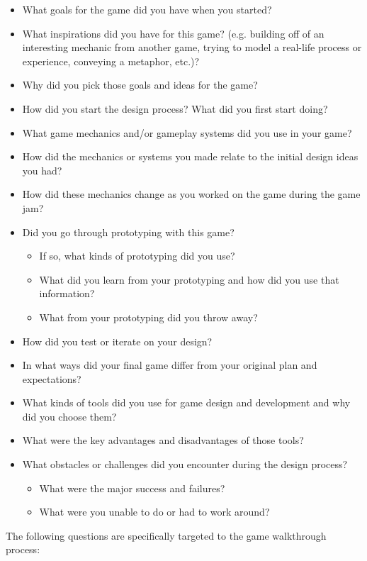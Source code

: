 \documentclass[]{article}
\begin{document}
\begin{itemize} \itemsep -2pt
	\item What goals for the game did you have when you started?
	\item What inspirations did you have for this game?  (e.g. building off of an interesting mechanic from another game, trying to model a real-life process or experience, conveying a metaphor, etc.)? 
	\item Why did you pick those goals and ideas for the game?
	\item How did you start the design process? What did you first start doing?
	\item What game mechanics and/or gameplay systems did you use in your game?
	\item How did the mechanics or systems you made relate to the initial design ideas you had?
	\item How did these mechanics change as you worked on the game during the game jam?
	\item Did you go through prototyping with this game?
		\begin{itemize} \itemsep -2pt
		\item If so, what kinds of prototyping did you use?
		\item What did you learn from your prototyping and how did you use that information?
		\item What from your prototyping did you throw away?
		\end{itemize}
	\item How did you test or iterate on your design?
	\item In what ways did your final game differ from your original plan and expectations?
	\item What kinds of tools did you use for game design and development and why did you choose them?
	\item What were the key advantages and disadvantages of those tools?
	\item What obstacles or challenges did you encounter during the design process?
		\begin{itemize} \itemsep -2pt
		\item What were the major success and failures?
		\item What were you unable to do or had to work around?
		\end{itemize}
\end{itemize}
The following questions are specifically targeted to the game walkthrough process:
\end{document}
